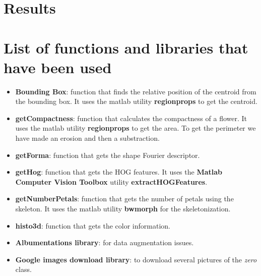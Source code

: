 \documentclass[11]{article}
\begin{document}
\section{Results}




\section{List of functions and libraries that have been used}
\begin{itemize}
\item \textbf{Bounding Box}: function that finds the relative position of the centroid from the bounding box. It uses the matlab utility \textbf{regionprops} to get the centroid.
\item \textbf{getCompactness}: function that calculates the compactness of a flower. It uses the matlab utility \textbf{regionprops} to get the area. To get the perimeter we have made an erosion and then a substraction. 
\item \textbf{getForma}: function that gets the shape Fourier descriptor. 
\item \textbf{getHog}: function that gets the HOG features. It uses the \textbf{Matlab Computer Vision Toolbox} utility \textbf{extractHOGFeatures}.
\item \textbf{getNumberPetals}: function that gets the number of petals using the skeleton. It uses the matlab utility \textbf{bwmorph} for the skeletonization. 
\item \textbf{histo3d}: function that gets the color information.
\item \textbf{Albumentations library}: for data augmentation issues.
\item \textbf{Google images download library}: to download several pictures of the \textit{zero} class.
\end{itemize}
\end{document}
